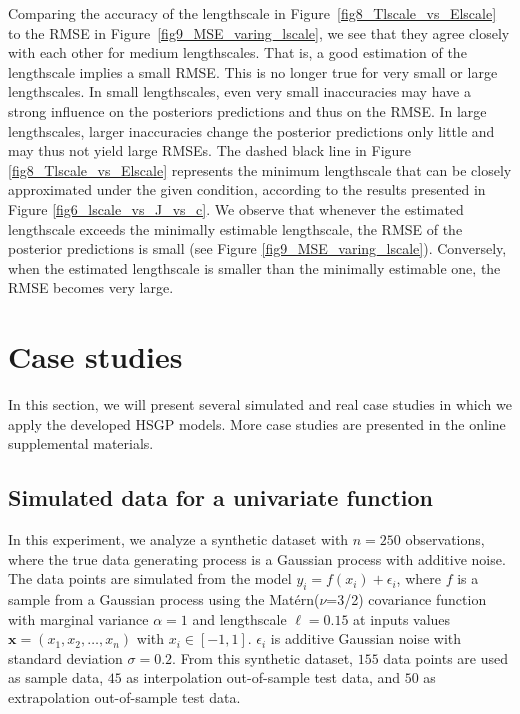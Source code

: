 \documentclass[onecolumn,a4paper,11pt]{article}
\begin{document}
Comparing the accuracy of the lengthscale in Figure~\ref{fig8_Tlscale_vs_Elscale} to the RMSE in Figure~\ref{fig9_MSE_varing_lscale}, we see that they agree closely with each other for medium lengthscales. That is, a good estimation of the lengthscale implies a small RMSE. This is no longer true for very small or large lengthscales. In small lengthscales, even very small inaccuracies  may have a strong influence on the posteriors predictions and thus on the RMSE. In large lengthscales, larger inaccuracies change the posterior predictions only little and may thus not yield large RMSEs. The dashed black line in Figure \ref{fig8_Tlscale_vs_Elscale} represents the  minimum lengthscale that can be closely approximated under the given condition, according to the results presented in Figure \ref{fig6_lscale_vs_J_vs_c}.  We observe that whenever the estimated lengthscale exceeds the minimally estimable lengthscale, the RMSE of the posterior predictions is small
(see Figure \ref{fig9_MSE_varing_lscale}). Conversely, when the estimated lengthscale is smaller than the minimally estimable one, the RMSE becomes very large.


\section{Case studies}\label{ch5_sec_cases}

In this section, we will present several simulated and real case studies in which we apply the developed HSGP models. More case studies are presented in the online supplemental materials.

\subsection{Simulated data for a univariate function}\label{ch5_sec_univariate_simu}

In this experiment, we analyze a synthetic dataset with $n = 250$ observations, where the true data generating process is a Gaussian process with additive noise. The data points are simulated from the model $y_i = f(x_i) + \epsilon_i$, where $f$ is a sample from a Gaussian process using the Mat{\'e}rn($\nu$=3/2) covariance function with marginal variance $\alpha=1$ and lengthscale $\ell=0.15$ at inputs values $\bm{x}=(x_1,x_2,\dots,x_n)$ with $x_i \in [-1,1]$. $\epsilon_i$ is additive Gaussian noise with standard deviation $\sigma=0.2$. From this synthetic dataset, $155$ data points are used as sample data, $45$ as interpolation out-of-sample test data, and $50$ as extrapolation out-of-sample test data.
\end{document}
